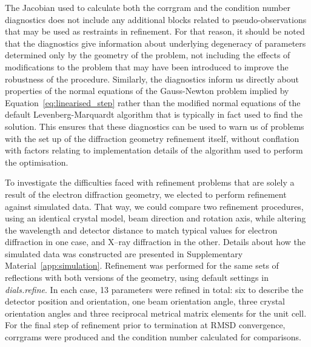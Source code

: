 \documentclass[preprint]{iucr}
\newcommand{\dialsrefine}{\emph{dials.refine}\xspace}
\begin{document}
The Jacobian used to calculate both the corrgram and the condition number
diagnostics does not include any additional blocks related to
pseudo-observations that may be used as restraints in refinement. For that
reason, it should be noted that the diagnostics give information about
underlying degeneracy of parameters determined only by the geometry of the
problem, not including the effects of modifications to the problem that may
have been introduced to improve the robustness of the procedure. Similarly, the
diagnostics inform us directly about properties of the normal equations of the
Gauss-Newton problem implied by Equation~\ref{eq:linearised_step} rather than
the modified normal equations of the default Levenberg-Marquardt algorithm that
is typically in fact used to find the solution. This ensures that these
diagnostics can be used to warn us of problems with the set up of the
diffraction geometry refinement itself, without conflation with factors
relating to implementation details of the algorithm used to perform the
optimisation.

To investigate the difficulties faced with refinement problems that are solely
a result of the electron diffraction geometry, we elected to perform refinement
against simulated data. That way, we could compare two refinement procedures,
using an identical crystal model, beam direction and rotation axis, while
altering the wavelength and detector distance to match typical values for
electron diffraction in one case, and X--ray diffraction in the other.
Details about how the simulated data was constructed are presented in
Supplementary Material~\ref{app:simulation}. Refinement
was performed for the same sets of reflections with both versions
of the geometry, using default settings in
\dialsrefine. In each case, 13 parameters were refined in total: six to
describe the detector position and orientation, one beam orientation angle,
three crystal orientation angles and three reciprocal metrical matrix elements
for the unit cell. For the final step of refinement prior to termination at
RMSD convergence, corrgrams were produced and the condition number calculated
for comparisons.
\end{document}

